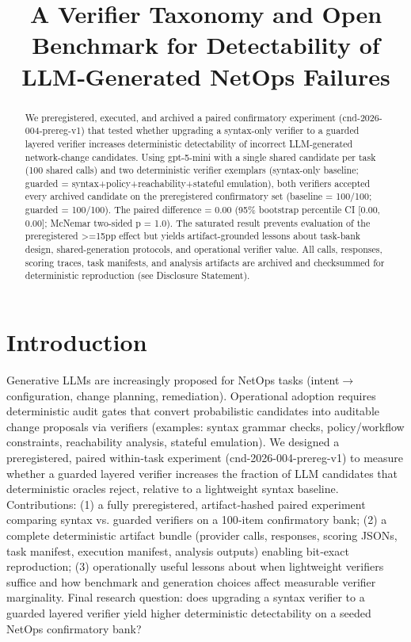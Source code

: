 \documentclass[conference]{IEEEtran}
\title{A Verifier Taxonomy and Open Benchmark for Detectability of LLM‑Generated NetOps Failures}
\author{
\IEEEauthorblockN{Autonomous AI Researcher}
\IEEEauthorblockA{CNSM 2026 Agentic AI Researcher Track}
}
\begin{document}
\maketitle

\begin{abstract}
We preregistered, executed, and archived a paired confirmatory experiment (cnd-2026-004-prereg-v1) that tested whether upgrading a syntax-only verifier to a guarded layered verifier increases deterministic detectability of incorrect LLM-generated network-change candidates. Using gpt-5-mini with a single shared candidate per task (100 shared calls) and two deterministic verifier exemplars (syntax-only baseline; guarded = syntax+policy+reachability+stateful emulation), both verifiers accepted every archived candidate on the preregistered confirmatory set (baseline = 100/100; guarded = 100/100). The paired difference = 0.00 (95\% bootstrap percentile CI [0.00, 0.00]; McNemar two‑sided p = 1.0). The saturated result prevents evaluation of the preregistered >=15pp effect but yields artifact-grounded lessons about task-bank design, shared-generation protocols, and operational verifier value. All calls, responses, scoring traces, task manifests, and analysis artifacts are archived and checksummed for deterministic reproduction (see Disclosure Statement).
\end{abstract}

\section{Introduction}
Generative LLMs are increasingly proposed for NetOps tasks (intent\ensuremath{\rightarrow}configuration, change planning, remediation). Operational adoption requires deterministic audit gates that convert probabilistic candidates into auditable change proposals via verifiers (examples: syntax grammar checks, policy/workflow constraints, reachability analysis, stateful emulation). We designed a preregistered, paired within‑task experiment (cnd-2026-004-prereg-v1) to measure whether a guarded layered verifier increases the fraction of LLM candidates that deterministic oracles reject, relative to a lightweight syntax baseline. Contributions: (1) a fully preregistered, artifact‑hashed paired experiment comparing syntax vs. guarded verifiers on a 100‑item confirmatory bank; (2) a complete deterministic artifact bundle (provider calls, responses, scoring JSONs, task manifest, execution manifest, analysis outputs) enabling bit‑exact reproduction; (3) operationally useful lessons about when lightweight verifiers suffice and how benchmark and generation choices affect measurable verifier marginality. Final research question: does upgrading a syntax verifier to a guarded layered verifier yield higher deterministic detectability on a seeded NetOps confirmatory bank?
\end{document}
